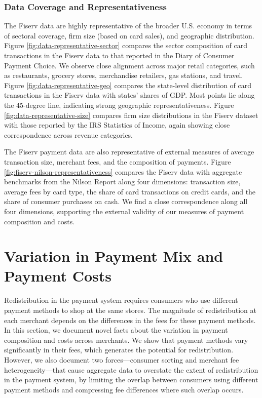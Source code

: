 \documentclass[11pt,english]{article}
\theoremstyle{remark}
\begin{document}
\subsubsection{Data Coverage and Representativeness}

The Fiserv data are highly representative of the broader U.S. economy in terms of sectoral coverage, firm size (based on card sales), and geographic distribution.
Figure \ref{fig:data-representative-sector} compares the sector composition of card transactions in the Fiserv data to that reported in the Diary of Consumer Payment Choice.
We observe close alignment across major retail categories, such as restaurants, grocery stores, merchandise retailers, gas stations, and travel.
Figure \ref{fig:data-representative-geo} compares the state-level distribution of card transactions in the Fiserv data with states' shares of GDP.
Most points lie along the 45-degree line, indicating strong geographic representativeness.
Figure \ref{fig:data-representative-size} compares firm size distributions in the Fiserv dataset with those reported by the IRS Statistics of Income, again showing close correspondence across revenue categories.

The Fiserv payment data are also representative of external measures of average transaction size, merchant fees, and the composition of payments.
Figure \ref{fig:fiserv-nilson-representativeness} compares the Fiserv data with aggregate benchmarks from the Nilson Report along four dimensions: transaction size, average fees by card type, the share of card transactions on credit cards, and the share of consumer purchases on cash.
We find a close correspondence along all four dimensions, supporting the external validity of our measures of payment composition and costs.



\section{Variation in Payment Mix and Payment Costs\label{sec:costs}}

Redistribution in the payment system requires consumers who use different payment methods to shop at the same stores.
The magnitude of redistribution at each merchant depends on the differences in the fees for these payment methods.
In this section, we document novel facts about the variation in payment composition and costs across merchants.
We show that payment methods vary significantly in their fees, which generates the potential for redistribution.
However, we also document two forces---consumer sorting and merchant fee heterogeneity---that cause aggregate data to overstate the extent of redistribution in the payment system, by limiting the overlap between consumers using different payment methods and compressing fee differences where such overlap occurs.
\end{document}

